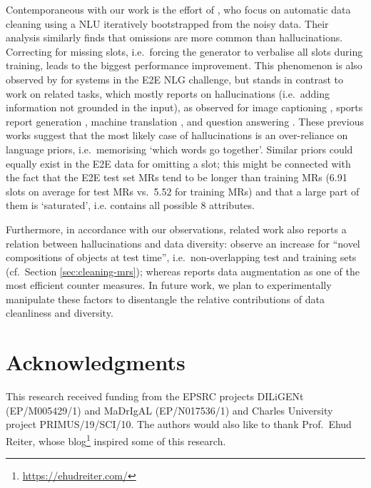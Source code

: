 \documentclass[11pt,a4paper]{article}
\begin{document}
Contemporaneous with our work is the effort of \citet{Hallucination:ACL2019}, who focus on automatic data cleaning using a NLU iteratively bootstrapped from the noisy data. Their analysis similarly finds that omissions are more common than hallucinations. 
Correcting for missing slots, i.e.\ forcing the generator to verbalise all slots during training,
leads to the biggest performance improvement.
This phenomenon is also observed by \citet{dusek_findings_2018,dusek_evaluating_2019} for systems in the E2E NLG challenge, but stands in contrast to work on related tasks, which mostly reports on hallucinations (i.e.\ adding information not grounded in the input), as observed for image captioning \cite{rohrbach-etal-2018-object}, sports report generation \cite{wiseman_challenges_2017}, machine translation \cite{koehn_six_2017,lee2019hallucinations}, and question answering \cite{feng_pathologies_2018}.
These previous works suggest that the most likely case of hallucinations is an over-reliance on language priors, i.e.\ memorising `which words go together'. Similar priors could equally exist in the E2E data for omitting a slot; this might be connected with the fact that the E2E test set MRs tend to be longer than training MRs (6.91 slots on average for test MRs vs.\ 5.52 for training MRs) and that a large part of them is `saturated', i.e. contains all possible 8 attributes.



 Furthermore, in accordance with our observations, related work also reports a relation between hallucinations and data diversity: \citet{rohrbach-etal-2018-object} observe an increase for ``novel compositions of objects at test time'', i.e.\ non-overlapping test and training sets (cf.\ Section \ref{sec:cleaning-mrs}); whereas \citet{lee2019hallucinations} reports data augmentation as one of the most efficient counter measures. 
 In future work, we plan to experimentally manipulate these factors to disentangle the relative contributions of data cleanliness and diversity.










\section*{Acknowledgments}

This research received funding from the EPSRC projects  DILiGENt (EP/M005429/1) and  MaDrIgAL (EP/N017536/1) and Charles University project PRIMUS/19/SCI/10. 
The authors would also like to thank Prof.~Ehud Reiter, whose blog\footnote{\url{https://ehudreiter.com/}} inspired some of this research.
\end{document}
